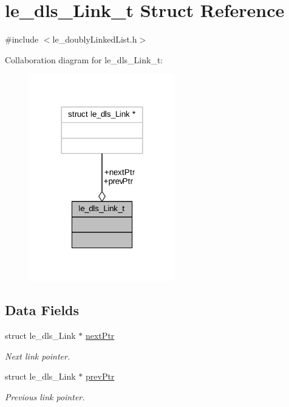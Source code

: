 \hypertarget{structle__dls___link__t}{}\section{le\+\_\+dls\+\_\+\+Link\+\_\+t Struct Reference}
\label{structle__dls___link__t}


{\ttfamily \#include $<$le\+\_\+doubly\+Linked\+List.\+h$>$}



Collaboration diagram for le\+\_\+dls\+\_\+\+Link\+\_\+t\+:
\nopagebreak
\begin{figure}[H]
\begin{center}
\leavevmode
\includegraphics[width=180pt]{structle__dls___link__t__coll__graph}
\end{center}
\end{figure}
\subsection*{Data Fields}
\begin{DoxyCompactItemize}
\item 
struct le\+\_\+dls\+\_\+\+Link $\ast$ \hyperlink{structle__dls___link__t_aeb5c99f0b4fb15daefef9b81f04b98dc}{next\+Ptr}
\begin{DoxyCompactList}\small\item\em Next link pointer. \end{DoxyCompactList}\item 
struct le\+\_\+dls\+\_\+\+Link $\ast$ \hyperlink{structle__dls___link__t_acf978c7d31cf7ab2aa0f7b36603f4a12}{prev\+Ptr}
\begin{DoxyCompactList}\small\item\em Previous link pointer. \end{DoxyCompactList}\end{DoxyCompactItemize}


